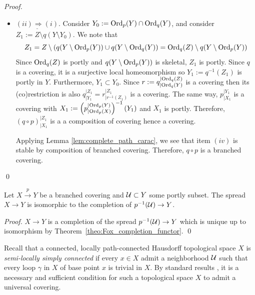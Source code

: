 \begin{proof}
\begin{itemize}
 
  \item $\underline{(ii)\Rightarrow (i)}$. Consider $Y_0 :=\mathrm{Ord}_p(Y)\cap \mathrm{Ord}_q(Y)$, and consider $Z_1 := Z\setminus q(Y\setminus Y_0)$. We note that $$Z_1= Z\setminus (q(Y\setminus \mathrm{Ord}_p(Y)) \cup q(Y\setminus \mathrm{Ord}_q(Y)) =  \mathrm{Ord}_q(Z) \setminus q(Y\setminus \mathrm{Ord}_p(Y))$$ 
 Since $\mathrm{Ord}_q(Z)$ is portly and $q(Y\setminus \mathrm{Ord}_p(Y))$ is skeletal, $Z_1$ is portly. Since $q$ is a covering, it is a surjective local homeomorphism so $Y_1:=q^{-1}(Z_1)$ is portly in $Y$. Furthermore, $Y_1\subset Y_0$.
 Since $r:=q_{|\mathrm{Ord}_q(Y)}^{|\mathrm{Ord}_q(Z)}$ is a covering then its (co)restriction is also $q_{|Y_1}^{|Z_1} = r_{|r^{-1}(Z_1)}^{|Z_1}$ is a covering.
 The same way, $p_{|X_1}^{|Y_1}$ is a covering with $X_1:= \left(p^{|\mathrm{Ord}_p(Y)}_{|\mathrm{Ord}_p(X)}\right)^{-1}(Y_1)$ and $X_1$ is portly. 
 Therefore, $(q\circ p)_{|X_1}^{|Z_1}$ is a a composition of covering hence a covering. 
 
 Applying Lemma \ref{lem:complete_path_carac}, we see that item $(iv)$ is stable by composition of branched covering. Therefore, $q\circ p$ is a branched covering.
 \end{itemize}
\qed\end{proof}





\begin{lem}\label{rem:completion_covering} Let $X\xrightarrow{p} Y$ be a branched covering and $\mathcal{U}\subset Y$ some portly subset. The spread $X\rightarrow Y$ is isomorphic to the completion of $p^{-1}(\mathcal{U})\rightarrow Y$.
\end{lem}
\begin{proof}
 $X\rightarrow Y$ is a completion of the spread $p^{-1}(\mathcal{U})\rightarrow Y$ which is unique up to isomorphism by Theorem~\ref{theo:Fox_completion_functor}.
\qed\end{proof}




Recall that a connected, locally path-connected Hausdorff topological space $X$ is {\it semi-locally simply connected} if every $x\in X$ admit a neighborhood $\mathcal{U}$ such that every loop $\gamma$ in $X$ of base point $x$ is trivial in $X$. By standard results \cite{MR1700700}, it is a necessary and sufficient condition for such a topological space $X$ to admit a universal covering.

